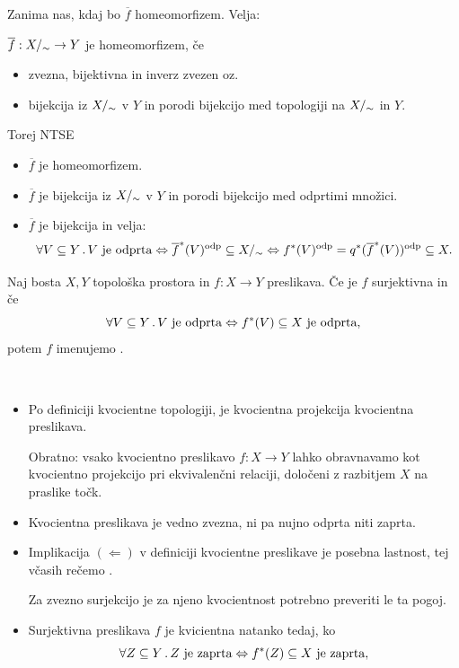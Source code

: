 \newpage
Zanima nas, kdaj bo \(\overline{f}\) homeomorfizem. Velja:

\(\overline{f}: {X/_\sim} \to Y\) je homeomorfizem, če 
\begin{itemize}
    \item zvezna, bijektivna in inverz zvezen oz.
    \item bijekcija iz \({X/_\sim}\) v \(Y\) in porodi bijekcijo med topologiji na \({X/_\sim}\) in \(Y\).
\end{itemize}
Torej NTSE
\begin{itemize}
    \item \(\overline{f}\) je homeomorfizem.
    \item \(\overline{f}\) je bijekcija iz \({X/_\sim}\) v \(Y\) in porodi bijekcijo med odprtimi množici.
    \item \(\overline{f}\) je bijekcija in velja: \[\forall V \subseteq Y \,.\, V \ \text{je odprta} \Leftrightarrow \overline{f}^{*}(V)^{\text{odp}} \subseteq {X/_\sim} \Leftrightarrow f^{*}(V)^{\text{odp}} =  q^{*}(\overline{f}^{*}(V))^{\text{odp}} \subseteq X.\]
\end{itemize}

\begin{definicija}
    Naj bosta \(X, Y\) topološka prostora in \(f: X \to Y\) preslikava. Če je \(f\) surjektivna in če 
    \[\all{V \subseteq Y} V \ \text{je odprta} \liff \invimg{f}(V) \subseteq X \ \text{je odprta},\]
    potem \(f\) imenujemo .
\end{definicija}

\begin{opomba}
    \
    \begin{itemize}
        \item Po definiciji kvocientne topologiji, je kvocientna projekcija kvocientna preslikava. 
        
        Obratno: vsako kvocientno preslikavo \(f: X \to Y\) lahko obravnavamo kot kvocientno projekcijo pri ekvivalenčni relaciji, določeni z razbitjem \(X\) na praslike točk.
        \item Kvocientna preslikava je vedno zvezna, ni pa nujno odprta niti zaprta.
        \item Implikacija \((\Leftarrow)\) v definiciji kvocientne preslikave je posebna lastnost, tej včasih rečemo .
        
        Za zvezno surjekcijo je za njeno kvocientnost potrebno preveriti le ta pogoj.
        \item Surjektivna preslikava \(f\) je kvicientna natanko tedaj, ko 
        \[\all{Z \subseteq Y} Z \ \text{je zaprta} \liff \invimg{f}(Z) \subseteq X \ \text{je zaprta},\]
    \end{itemize}
\end{opomba}

